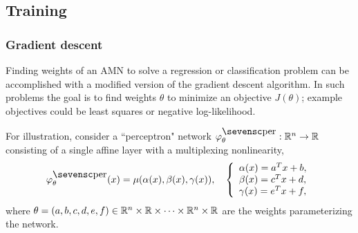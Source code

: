 \documentclass[10pt]{article}
\newcommand{\amn}{\varphi}
\theoremstyle{remark}
\theoremstyle{definition}
\theoremstyle{plain}
\begin{document}
\subsection{Training}
\subsubsection{Gradient descent}
Finding weights of an AMN to solve a regression or classification problem can
be accomplished with a modified version of the gradient descent algorithm.  In
such problems the goal is to find weights $\theta$ to minimize an objective
$J(\theta)$; example objectives could be least squares or negative
log-likelihood.

For illustration, consider a ``perceptron" network
$\amn^\mathsc{per}_\theta:\reals^n\to\reals$ consisting of a single affine
layer with a multiplexing nonlinearity,
\[
	\amn^\mathsc{per}_\theta(x) = \mu(\alpha(x), \beta(x), \gamma(x)),
	\quad
	\left\{
	\begin{array}{l}
		\alpha(x) = a^T x + b,\\
		\beta(x) = c^T x + d,\\
		\gamma(x) = e^T x + f,
	\end{array}
	\right.
\]
where
$\theta=(a,b,c,d,e,f)\in\mathbb{R}^n\times\mathbb{R}\times\cdots\times\mathbb{R}^n\times\mathbb{R}$
are the weights parameterizing the network. 
\end{document}
